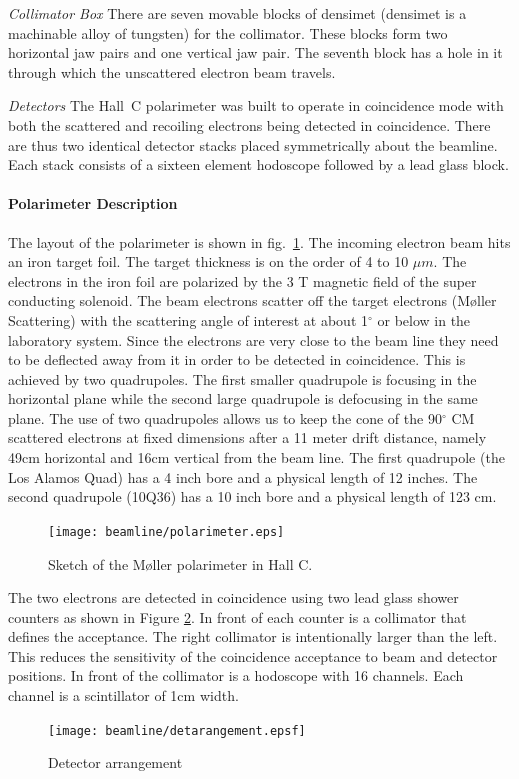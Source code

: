 {\sl Collimator Box} There are seven movable blocks of densimet (densimet is
a machinable alloy of tungsten) for the collimator. These blocks form two
horizontal jaw pairs and one vertical jaw pair. The seventh block has a
hole in it through which the unscattered electron beam travels.

{\sl Detectors} The Hall~C polarimeter was built to operate in coincidence
mode with both the scattered and recoiling electrons being detected in
coincidence. There are thus two identical detector stacks placed symmetrically
about the beamline. Each stack consists of a sixteen element hodoscope
followed by a lead glass block.

\paragraph{Polarimeter Description}
The layout of the polarimeter is shown in fig.~\ref{polscetch}.
The incoming electron beam hits an iron target foil. The target thickness
is on the order of 4 to 10 $\mu m$. The electrons in the iron foil
are polarized by the 3 T magnetic field of the super conducting solenoid.
The beam electrons scatter off 
the target electrons (M\o ller Scattering) 
with the scattering angle of interest at about
1$^{\circ}$ or below in the laboratory system. Since the electrons
are very close to the beam line they need to be deflected away from
it in order to be detected in coincidence. This is achieved by
two quadrupoles. The first smaller quadrupole is focusing in the
horizontal plane  while the
second large quadrupole is defocusing in the same plane. The use of two quadrupoles
allows us to keep the cone of the 90$^{\circ}$ CM scattered electrons 
at fixed dimensions after a 11 meter drift distance, namely
49cm horizontal and 16cm vertical from the beam line.
The first quadrupole (the Los Alamos Quad) has a 4 inch bore and a
physical length of 12 inches. The second quadrupole (10Q36) has a 10
inch bore and a physical length of 123 cm.
\begin{figure}[htp]
\begin{center}
\texttt{[image: beamline/polarimeter.eps]}
\caption{Sketch of the M\o ller polarimeter in Hall C.\label{polscetch}}
\end{center}
\end{figure}
The two electrons are detected in coincidence using two lead glass 
shower counters as shown in Figure \ref{detarr}. In front of each counter is a collimator that defines
the acceptance. The right collimator is intentionally larger
than the left. This reduces the sensitivity of the coincidence 
acceptance to beam and detector positions. In front of the collimator
is a hodoscope with 16 channels. Each channel is a scintillator of 1cm
width.
\begin{figure}
\texttt{[image: beamline/detarangement.epsf]}
\begin{center}
\parbox{10cm}{
\caption{Detector arrangement}\label{detarr}}
\end{center}
\end{figure}

